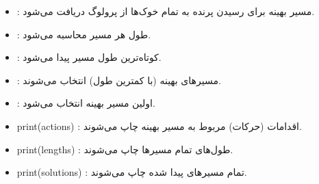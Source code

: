 \documentclass[11pt, a4paper, oneside]{article}
\begin{document}
\begin{itemize}
	\item {} : مسیر بهینه برای رسیدن پرنده به تمام خوک‌ها از پرولوگ دریافت می‌شود.
	\item {} : طول هر مسیر محاسبه می‌شود.
	\item {}: کوتاه‌ترین طول مسیر پیدا می‌شود.
	\item {} : مسیرهای بهینه (با کمترین طول) انتخاب می‌شوند.
	\item {} : اولین مسیر بهینه انتخاب می‌شود.
	\item print(actions) : اقدامات (حرکات) مربوط به مسیر بهینه چاپ می‌شوند.
	\item print(lengths) : طول‌های تمام مسیرها چاپ می‌شوند.
	\item print(solutions) : تمام مسیرهای پیدا شده چاپ می‌شوند.
\end{itemize}		
\end{document}
